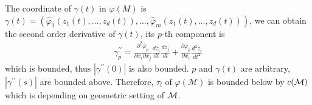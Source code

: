 
The coordinate of $\gamma(t)$ in $\varphi(M)$ is $\gamma(t)=\left(\hat{\varphi}_1(z_1(t),\dots,z_d(t)),\dots,\hat{\varphi}_m(z_1(t),\dots,z_d(t))\right)$, we can obtain the second order derivative of $\gamma(t)$, its $p$-th component is
\begin{align}
	\gamma^{\prime \prime}_p=\frac{\partial^2 \hat{\varphi}_p}{\partial x_i \partial x_j}\frac{dz_i}{dt}\frac{dz_j}{dt}+\frac{\partial \hat{\varphi}_p}{\partial x_i}\frac{d^2z_i}{dt^2}
\end{align}
which is bounded, thus $|\gamma^{\prime \prime}(0)|$ is also bounded. $p$ and $\gamma(t)$ are arbitrary, $|\gamma^{\prime \prime}(s)|$ are bounded above. Therefore, $\tau_l$ of $\varphi(\mathcal{M})$ is bounded below by $c(\mathcal{M})$ which is depending on geometric setting of $\mathcal{M}$.
\fi






